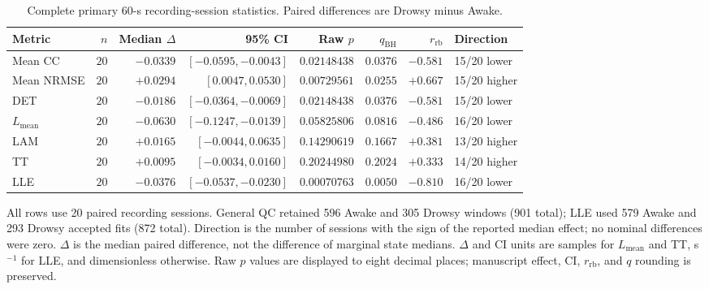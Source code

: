 \begin{table}[p]
\centering
\footnotesize
\setlength{\tabcolsep}{2.2pt}
\renewcommand{\arraystretch}{1.08}
\caption{Complete primary 60-s recording-session statistics. Paired differences are Drowsy minus Awake.}
\label{tab:supp_primary}
\begin{tabular}{lrrrrrrl}
\toprule
Metric & $n$ & Median $\Delta$ & 95\% CI & Raw $p$ & $q_{\mathrm{BH}}$ & $r_{\mathrm{rb}}$ & Direction \\
\midrule
Mean CC & $20$ & $-0.0339$ & $[-0.0595, -0.0043]$ & $0.02148438$ & $0.0376$ & $-0.581$ & 15/20 lower \\
Mean NRMSE & $20$ & $+0.0294$ & $[0.0047, 0.0530]$ & $0.00729561$ & $0.0255$ & $+0.667$ & 15/20 higher \\
DET & $20$ & $-0.0186$ & $[-0.0364, -0.0069]$ & $0.02148438$ & $0.0376$ & $-0.581$ & 15/20 lower \\
$L_{\mathrm{mean}}$ & $20$ & $-0.0630$ & $[-0.1247, -0.0139]$ & $0.05825806$ & $0.0816$ & $-0.486$ & 16/20 lower \\
LAM & $20$ & $+0.0165$ & $[-0.0044, 0.0635]$ & $0.14290619$ & $0.1667$ & $+0.381$ & 13/20 higher \\
TT & $20$ & $+0.0095$ & $[-0.0034, 0.0160]$ & $0.20244980$ & $0.2024$ & $+0.333$ & 14/20 higher \\
LLE & $20$ & $-0.0376$ & $[-0.0537, -0.0230]$ & $0.00070763$ & $0.0050$ & $-0.810$ & 16/20 lower \\
\bottomrule
\end{tabular}
\par\smallskip
\begin{minipage}{0.98\linewidth}
\footnotesize All rows use 20 paired recording sessions. General QC retained 596 Awake and 305 Drowsy windows (901 total); LLE used 579 Awake and 293 Drowsy accepted fits (872 total). Direction is the number of sessions with the sign of the reported median effect; no nominal differences were zero. $\Delta$ is the median paired difference, not the difference of marginal state medians. $\Delta$ and CI units are samples for $L_{\mathrm{mean}}$ and TT, s$^{-1}$ for LLE, and dimensionless otherwise. Raw $p$ values are displayed to eight decimal places; manuscript effect, CI, $r_{\mathrm{rb}}$, and $q$ rounding is preserved.
\end{minipage}
\end{table}

\clearpage
\endgroup
